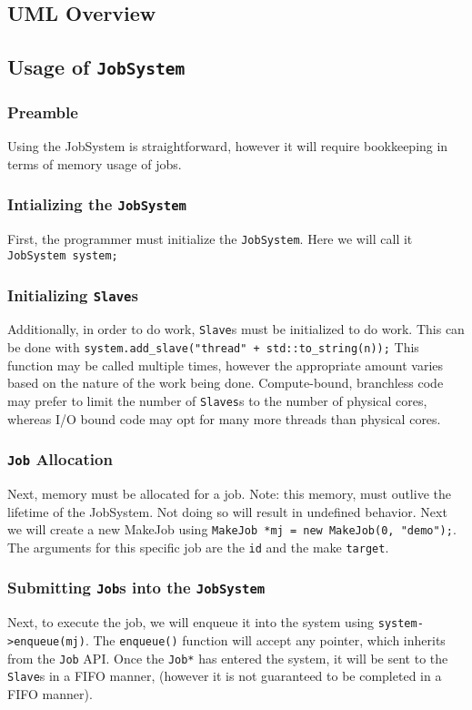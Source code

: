 \documentclass{article}
\begin{document}
	\subsection{UML Overview}
		
	\subsection{Usage of \texttt{JobSystem}}
		\subsubsection{Preamble}
			Using the JobSystem is straightforward, however it will require bookkeeping in terms of memory usage of jobs. 
		\subsubsection{Intializing the \texttt{JobSystem}}
			First, the programmer must initialize the \texttt{JobSystem}. Here we will call it \texttt{JobSystem system;}
		\subsubsection{Initializing \texttt{Slave}s}
			Additionally, in order to do work, \texttt{Slave}s must be initialized to do work. This can be done with \texttt{system.add\_slave("thread" + std::to\_string(n));} This function may be called multiple times, however the appropriate amount varies based on the nature of the work being done. Compute-bound, branchless code may prefer to limit the number of \texttt{Slaves}s to the number of physical cores, whereas I/O bound code may opt for many more threads than physical cores.
		\subsubsection{\texttt{Job} Allocation}
			Next, memory must be allocated for a job. Note: this memory, must outlive the lifetime of the JobSystem. Not doing so will result in undefined behavior. Next we will create a new MakeJob using \texttt{MakeJob *mj = new MakeJob(0, "demo");}. The arguments for this specific job are the \texttt{id} and the make \texttt{target}. 
		\subsubsection{Submitting \texttt{Job}s into the \texttt{JobSystem}}
			Next, to execute the job, we will enqueue it into the system using \texttt{system->enqueue(mj)}. The \texttt{enqueue()} function will accept any pointer, which inherits from the \texttt{Job} API. Once the \texttt{Job*} has entered the system, it will be sent to the \texttt{Slave}s in a FIFO manner, (however it is not guaranteed to be completed in a FIFO manner).
\end{document}
